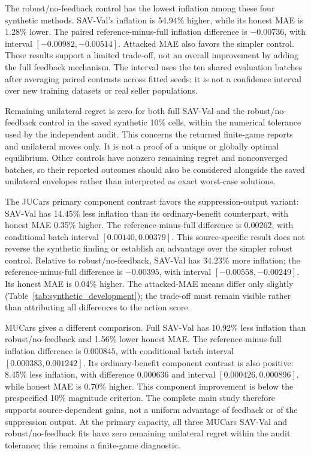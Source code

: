 \documentclass[10pt,journal]{IEEEtran}
\begin{document}
The robust/no-feedback control has the lowest inflation among these
four synthetic methods. SAV-Val's inflation is 54.94\% higher, while its honest
MAE is 1.28\% lower. The paired reference-minus-full inflation difference
is $-0.00736$, with interval $[-0.00982,-0.00514]$. Attacked MAE also
favors the simpler control. These results support a limited trade-off,
not an overall improvement by adding the full feedback mechanism.
The interval uses the ten shared evaluation batches after averaging
paired contrasts across fitted seeds; it is not a confidence interval
over new training datasets or real seller populations.

Remaining unilateral regret is zero for both full SAV-Val and the
robust/no-feedback control in the saved synthetic 10\% cells, within
the numerical tolerance used by the independent audit. This concerns
the returned finite-game reports and unilateral moves only. It is not
a proof of a unique or globally optimal equilibrium. Other controls
have nonzero remaining regret and nonconverged batches, so their
reported outcomes should also be considered alongside the saved
unilateral envelopes rather than interpreted as exact worst-case
solutions.

The JUCars primary component contrast favors the suppression-output
variant: SAV-Val has 14.45\% less inflation than its ordinary-benefit
counterpart, with honest MAE 0.35\% higher. The reference-minus-full
difference is $0.00262$, with conditional batch interval
$[0.00140,0.00379]$. This source-specific result does not reverse the
synthetic finding or establish an advantage over the simpler robust
control. Relative to robust/no-feedback, SAV-Val has 34.23\% more
inflation; the reference-minus-full difference is $-0.00395$, with
interval $[-0.00558,-0.00249]$. Its honest MAE is 0.04\% higher.
The attacked-MAE means differ only slightly (Table~\ref{tab:synthetic_development});
the trade-off must remain visible rather than attributing all differences
to the action score.

MUCars gives a different comparison. Full SAV-Val has 10.92\% less
inflation than robust/no-feedback and 1.56\% lower honest MAE. The
reference-minus-full inflation difference is $0.000845$, with conditional
batch interval $[0.000383,0.001242]$. Its ordinary-benefit component
contrast is also positive: 8.45\% less inflation, with difference
$0.000636$ and interval $[0.000426,0.000896]$, while honest MAE is
0.70\% higher. This component improvement is below the prespecified
10\% magnitude criterion. The complete main study therefore supports
source-dependent gains, not a uniform advantage of feedback or of the
suppression output. At the primary capacity, all three MUCars SAV-Val
and robust/no-feedback fits have zero remaining unilateral regret within
the audit tolerance; this remains a finite-game diagnostic.
\end{document}
